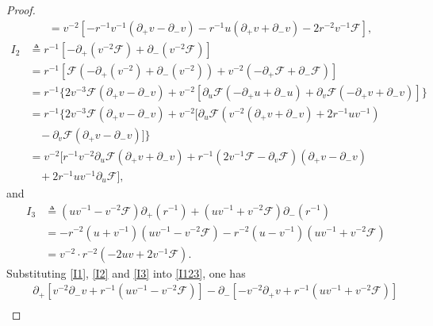 \documentclass[10pt,leqno]{amsart}
\numberwithin{equation}{section}
\begin{document}
\begin{proof}
\begin{equation}
\begin{aligned}
			& = v^{-2} [-r^{-1} v^{-1} ( \partial_{+}v-\partial_{-}v) - r^{-1} u ( \partial_{+} v + \partial_{-} v ) - 2r^{-2}v^{-1}\mathcal{F}],
		\end{aligned}
	\end{equation}
	\begin{equation}\label{I2}
		\begin{aligned}
			I_{2} & \triangleq  r^{-1} [ -\partial_{+} (v^{-2}\mathcal{F}) + \partial_{-} (v^{-2}\mathcal{F}) ] \\
			& =  r^{-1} [ \mathcal{F} ( -\partial_{+} (v^{-2}) + \partial_{-} (v^{-2}) ) +v^{-2} (-\partial_{+} \mathcal{F} + \partial_{-} \mathcal{F}) ] \\
			& =  r^{-1} \{2v^{-3} \mathcal{F} ( \partial_{+} v - \partial_{-} v ) +v^{-2} [\partial_{u} \mathcal{F} (-\partial_{+} u + \partial_{-} u) + \partial_{v} \mathcal{F} (-\partial_{+} v + \partial_{-} v)]\}  \\
			& = r^{-1} \{2v^{-3} \mathcal{F} ( \partial_{+} v - \partial_{-} v ) +v^{-2} [ \partial_{u} \mathcal{F} (v^{-2} (\partial_{+} v + \partial_{-}v) + 2r^{-1}uv^{-1}) \\
			& \ \ \ \  - \partial_{v} \mathcal{F} (\partial_{+} v - \partial_{-} v) ]\}  \\
			& = v^{-2} [  r^{-1}v^{-2}\partial_{u} \mathcal{F} (\partial_{+} v + \partial_{-}v) + r^{-1} ( 2v^{-1}\mathcal{F} - \partial_{v} \mathcal{F} ) (\partial_{+} v - \partial_{-}v) \\
			 & \ \ \ \ + 2r^{-1}uv^{-1}\partial_{u} \mathcal{F}],
		\end{aligned}
	\end{equation}
	and
	\begin{equation} \label{I3}
		\begin{aligned}
			I_{3} & \triangleq  (uv^{-1} - v^{-2} \mathcal{F})\partial_{+} (r^{-1}) + (uv^{-1} + v^{-2} \mathcal{F})\partial_{-} (r^{-1})\\
			& = -r^{-2} (u+v^{-1}) (uv^{-1} - v^{-2} \mathcal{F}) -r^{-2} (u-v^{-1}) (uv^{-1} + v^{-2} \mathcal{F}) \\
			& =  v^{-2} \cdot r^{-2} ( -2uv + 2v^{-1}\mathcal{F}  ) .
		\end{aligned}
	\end{equation}		
	Substituting \eqref{I1}, \eqref{I2} and \eqref{I3} into \eqref{I123}, one has
	\begin{equation}
		\begin{aligned}
			& \ \ \ \ \partial_{+} [v^{-2} \partial_{-} v + r^{-1} (uv^{-1}-v^{-2} \mathcal{F})]  - \partial_{-} [-v^{-2} \partial_{+} v + r^{-1} (uv^{-1}+v^{-2} \mathcal{F})]  \\

\end{aligned}
\end{equation}
\end{proof}
\end{document}
